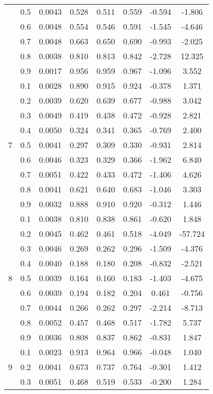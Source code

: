 \documentclass[11pt,a4paper]{report}
\begin{document}
\begin{longtable}{ | c | c || c | c | c | c | c | c | }
 & 0.5 & 0.0043 & 0.528 & 0.511 & 0.559 & -0.594 & -1.806 \\
 & 0.6 & 0.0048 & 0.554 & 0.546 & 0.591 & -1.545 & -4.646 \\
 & 0.7 & 0.0048 & 0.663 & 0.650 & 0.690 & -0.993 & -2.025 \\
 & 0.8 & 0.0038 & 0.810 & 0.813 & 0.842 & -2.728 & 12.325 \\
 & 0.9 & 0.0017 & 0.956 & 0.959 & 0.967 & -1.096 & 3.552 \\
 \hline
\multirow{9}{*}{7} & 0.1 & 0.0028 & 0.890 & 0.915 & 0.924 & -0.378 & 1.371 \\
 & 0.2 & 0.0039 & 0.620 & 0.639 & 0.677 & -0.988 & 3.042 \\
 & 0.3 & 0.0049 & 0.419 & 0.438 & 0.472 & -0.928 & 2.821 \\
 & 0.4 & 0.0050 & 0.324 & 0.341 & 0.365 & -0.769 & 2.400 \\
 & 0.5 & 0.0041 & 0.297 & 0.309 & 0.330 & -0.931 & 2.814 \\
 & 0.6 & 0.0046 & 0.323 & 0.329 & 0.366 & -1.962 & 6.840 \\
 & 0.7 & 0.0051 & 0.422 & 0.433 & 0.472 & -1.406 & 4.626 \\
 & 0.8 & 0.0041 & 0.621 & 0.640 & 0.683 & -1.046 & 3.303 \\
 & 0.9 & 0.0032 & 0.888 & 0.910 & 0.920 & -0.312 & 1.446 \\
 \hline
\multirow{9}{*}{8} & 0.1 & 0.0038 & 0.810 & 0.838 & 0.861 & -0.620 & 1.848 \\
 & 0.2 & 0.0045 & 0.462 & 0.461 & 0.518 & -4.049 & -57.724 \\
 & 0.3 & 0.0046 & 0.269 & 0.262 & 0.296 & -1.509 & -4.376 \\
 & 0.4 & 0.0040 & 0.188 & 0.180 & 0.208 & -0.832 & -2.521 \\
 & 0.5 & 0.0039 & 0.164 & 0.160 & 0.183 & -1.403 & -4.675 \\
 & 0.6 & 0.0039 & 0.194 & 0.182 & 0.204 & 0.461 & -0.756 \\
 & 0.7 & 0.0044 & 0.266 & 0.262 & 0.297 & -2.214 & -8.713 \\
 & 0.8 & 0.0052 & 0.457 & 0.468 & 0.517 & -1.782 & 5.737 \\
 & 0.9 & 0.0036 & 0.808 & 0.837 & 0.862 & -0.831 & 1.847 \\
 \hline
\multirow{9}{*}{9} & 0.1 & 0.0023 & 0.913 & 0.964 & 0.966 & -0.048 & 1.040 \\
 & 0.2 & 0.0041 & 0.673 & 0.737 & 0.764 & -0.301 & 1.412 \\
 & 0.3 & 0.0051 & 0.468 & 0.519 & 0.533 & -0.200 & 1.284 \\

\end{longtable}
\end{document}
